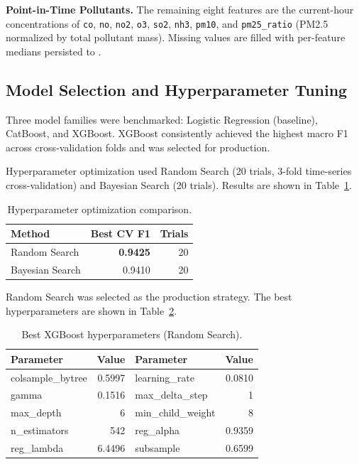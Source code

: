 \documentclass[sigconf, nonacm]{acmart}
\begin{document}
\textbf{Point-in-Time Pollutants.}
The remaining eight features are the current-hour
concentrations of \texttt{co}, \texttt{no}, \texttt{no2},
\texttt{o3}, \texttt{so2}, \texttt{nh3}, \texttt{pm10},
and \texttt{pm25\_ratio} (PM2.5 normalized by total
pollutant mass).  Missing values are filled with
per-feature medians persisted to
.

\subsection{Model Selection and Hyperparameter Tuning}

Three model families were benchmarked: Logistic Regression
(baseline), CatBoost, and XGBoost.  XGBoost consistently
achieved the highest macro F1 across cross-validation folds
and was selected for production.

Hyperparameter optimization used Random Search (20 trials,
3-fold time-series cross-validation) and Bayesian Search
(20 trials).  Results are shown in Table~\ref{tab:hpo}.

\begin{table}[h]
  \caption{Hyperparameter optimization comparison.}
  \label{tab:hpo}
  \small
  \begin{tabular}{@{}p{2.6cm}rr@{}}
    \toprule
    \textbf{Method} & \textbf{Best CV F1} & \textbf{Trials} \\
    \midrule
    Random Search   & \textbf{0.9425} & 20 \\
    Bayesian Search & 0.9410          & 20 \\
    \bottomrule
  \end{tabular}
\end{table}

Random Search was selected as the production strategy.
The best hyperparameters are shown in
Table~\ref{tab:bestparams}.

\begin{table}[h]
  \caption{Best XGBoost hyperparameters (Random Search).}
  \label{tab:bestparams}
  \small
  \begin{tabular}{@{}p{2.2cm}rp{2.2cm}r@{}}
    \toprule
    \textbf{Parameter} & \textbf{Value}
      & \textbf{Parameter} & \textbf{Value} \\
    \midrule
    colsample\_bytree & 0.5997 & learning\_rate     & 0.0810 \\
    gamma             & 0.1516 & max\_delta\_step   & 1      \\
    max\_depth        & 6      & min\_child\_weight & 8      \\
    n\_estimators     & 542    & reg\_alpha         & 0.9359 \\
    reg\_lambda       & 6.4496 & subsample          & 0.6599 \\
    \bottomrule
  \end{tabular}
\end{table}
\end{document}
